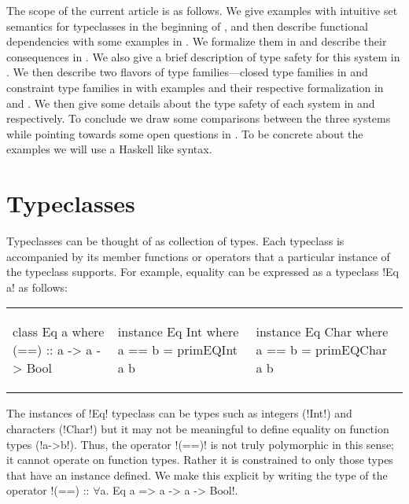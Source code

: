 \documentclass[format=acmsmall,manuscript,review,screen,nonacm,margin=1in,11pt]{acmart}
\begin{document}
The scope of the current article is as follows.
We give examples with intuitive set semantics for typeclasses in the beginning of ,
and then describe functional dependencies\cite{jones_tcfd_2000} with some examples in .
We formalize them in  and describe their consequences %
in .
We also give a brief description of type safety for this system in .
We then describe two flavors of type families---closed type families\cite{eisenberg_typefamilies_2014}
in  and  constraint type families\cite{morris_typefamilies_2017}
in  with examples and their respective formalization in 
and . We then give some details about the type safety of
each system in  and  respectively.
To conclude we %
draw some comparisons between the three systems while pointing towards some open questions in .
To be concrete about the examples we will use a Haskell like syntax.

\section{Typeclasses}\label{sec:tc}
Typeclasses can be thought of as collection of types. Each typeclass is accompanied by its member
functions or operators that a particular instance of the typeclass supports. For example,
equality can be expressed as a typeclass !Eq a! as follows:\newline
{\footnotesize
\begin{tabular}{l l l}
\begin{code}
class Eq a where
  (==) :: a -> a -> Bool
\end{code}&%
\begin{code}
instance Eq Int where
  a == b = primEQInt a b
\end{code}&%
\begin{code}
instance Eq Char where
  a == b = primEQChar a b
\end{code}
\end{tabular} }\newline
The instances of !Eq! typeclass can be types such as integers (!Int!) and characters (!Char!) but
it may not be meaningful to define equality on function types (!a->b!). Thus, the operator
!(==)! is not truly polymorphic in this sense; it cannot operate on function types. Rather
it is constrained to only those types that have an instance defined. We make this explicit by writing
the type of the operator !(==) :: $\forall$a. Eq a => a -> a -> Bool!. 
\end{document}
